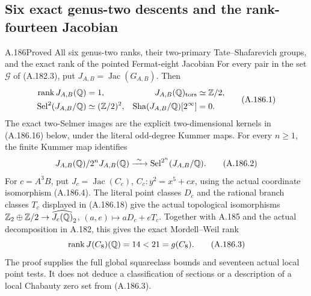 \subsection{Six exact genus-two descents and the rank-fourteen Jacobian}

\begin{statement}{A.186}{Proved}
{All six genus-two ranks, their two-primary Tate--Shafarevich groups,
and the exact rank of the pointed Fermat-eight Jacobian}
For every pair in the set \(\mathcal G\) of (A.182.3), put
\(J_{A,B}=\operatorname{Jac}(G_{A,B})\).  Then
\[
\begin{aligned}
 \operatorname{rank}J_{A,B}(\mathbb Q)&=1,
 &J_{A,B}(\mathbb Q)_{\rm tors}&\simeq\mathbb Z/2,\\
 \operatorname{Sel}^{2}(J_{A,B}/\mathbb Q)&\simeq(\mathbb Z/2)^2,
 &\operatorname{Sha}(J_{A,B}/\mathbb Q)[2^\infty]&=0.
\end{aligned}
\tag{A.186.1}
\]
The exact two-Selmer images are the explicit two-dimensional
kernels in (A.186.16) below, under the literal odd-degree Kummer
maps.  For every \(n\geq1\), the finite Kummer map identifies
\[
 J_{A,B}(\mathbb Q)/2^nJ_{A,B}(\mathbb Q)
       \xrightarrow{\ \sim\ }
       \operatorname{Sel}^{2^n}(J_{A,B}/\mathbb Q).
\tag{A.186.2}
\]
For \(c=A^3B\), put
\(J_c=\operatorname{Jac}(C_c)\),
\(C_c:y^2=x^5+cx\), using the actual coordinate
isomorphism (A.186.4).  The literal point classes
\(D_c\) and the rational
branch classes \(T_c\) displayed in (A.186.18)
give the actual topological isomorphisms
\(\mathbb Z_2\oplus\mathbb Z/2\to\widehat{J_c(\mathbb Q)}_2\),
\((a,e)\mapsto aD_c+eT_c\).
Together with A.185 and the actual decomposition in A.182, this
gives the exact Mordell--Weil rank
\[
                 \operatorname{rank}J(C_8)(\mathbb Q)=14<21=g(C_8).
\tag{A.186.3}
\]
The proof supplies the full global squareclass bounds and seventeen
actual local point tests.  It does not deduce a classification of
sections or a description of a local Chabauty zero set from (A.186.3).
\end{statement}

